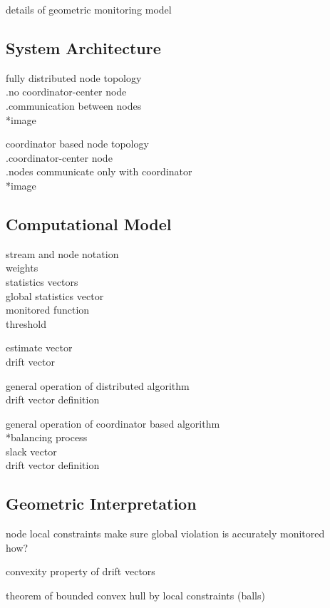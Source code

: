details of geometric monitoring model

\subsection{System Architecture} \label{subsec:theorBack-GM-sysArch}

fully distributed node topology\\
	.no coordinator-center node\\
	.communication between nodes\\
	*image

coordinator based node topology\\
	.coordinator-center node\\
	.nodes communicate only with coordinator\\
	*image

\subsection{Computational Model} \label{subsec:theorBack-GM-compMod}

stream and node notation\\
weights\\
statistics vectors\\
	global statistics vector\\
monitored function\\
threshold

estimate vector\\
drift vector

general operation of distributed algorithm\\
	drift vector definition

general operation of coordinator based algorithm\\
	*balancing process\\
		slack vector\\
	drift vector definition

\subsection{Geometric Interpretation} \label{subsec:theorBack-GM-geomInt}

node local constraints make sure global violation is accurately monitored\\
how?

convexity property of drift vectors

theorem of bounded convex hull by local constraints (balls)


